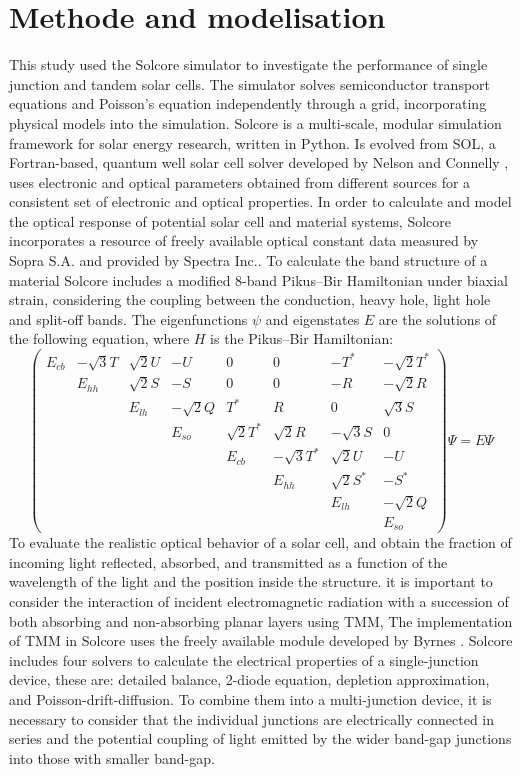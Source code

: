 \documentclass[preprint,12pt]{elsarticle}
\begin{document}
\section{Methode and modelisation}

This study used the Solcore simulator to investigate the performance of single junction and tandem solar cells. The simulator solves semiconductor transport equations and Poisson's equation independently through a grid, incorporating physical models into the simulation.
Solcore is a multi-scale, modular simulation framework for solar energy research, written in Python. Is evolved from SOL, a Fortran-based, quantum well solar cell solver developed by Nelson and Connelly \cite{book1}, uses electronic and optical parameters obtained from different sources for a consistent set of electronic and optical properties. In order to calculate and model the optical response of potential solar cell and material systems, Solcore incorporates a resource of freely available optical constant data measured by Sopra S.A. and provided by Spectra Inc.\cite{sopra2008optical}. To calculate the band structure of a material Solcore includes a modified 8-band Pikus–Bir Hamiltonian under biaxial strain, considering the coupling between the conduction, heavy hole, light hole and split-off bands. The eigenfunctions $\psi$ and eigenstates $E$ are the solutions of the following equation, where $H$ is the Pikus–Bir Hamiltonian:
$$ \begin{pmatrix}
		E_{cb} & -\sqrt{3}T & \sqrt{2}U & -U & 0 & 0 & -T^{*}  & -\sqrt{2}T^{*}  \\
		& E_{hh} & \sqrt{2}S & -S & 0 & 0 & -R & -\sqrt{2}R \\
		&  & E_{lh}& -\sqrt{2}Q & T^{*} & R & 0 & \sqrt{3}S \\
		&  &  & E_{so} & \sqrt{2}T^{*} & \sqrt{2}R & -\sqrt{3}S & 0 \\
		&  &  &  & E_{cb} & -\sqrt{3}T^{*} & \sqrt{2}U & -U \\
		&  &  &  &  & E_{hh} & \sqrt{2}S^{*} & -S^{*} \\
		&  &  &  &  &  & E_{lh} & -\sqrt{2}Q \\
		&  &  &  &  &  &  & E_{so}
\end{pmatrix} \Psi = E\Psi $$
To evaluate the realistic optical behavior of a solar cell, and obtain the fraction of incoming light reflected, absorbed, and transmitted as a function of the wavelength of the light and the position inside the structure. it is important to consider the interaction of incident electromagnetic radiation with a succession of both absorbing and non-absorbing planar layers using TMM, The implementation of TMM in Solcore uses the freely available module developed by Byrnes \cite{byrnes2016multilayer}. Solcore includes four solvers to calculate the electrical properties of a single-junction device, these are: detailed balance, 2-diode equation, depletion approximation, and Poisson-drift-diffusion. To combine them into a multi-junction device, it is necessary to consider that the individual junctions are electrically connected in series and the potential coupling of light emitted by the wider band-gap junctions into those with smaller band-gap.
\end{document}
